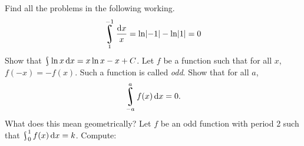 \begin{questions}
  \questioA Find all the problems in the following working.
            \begin{align*}
              \rint^{-1}_1 \frac{\dif{x}}{x} = \ln \abs{-1} - \ln \abs{1} = 0
            \end{align*}
  \questioA Show that $ \rint \ln x \dif{x} = x\ln x - x + C $.
  \questioM Let $ f $ be a function such that for all $ x $, $ f(-x) = -f(x) $. Such a function is called \textit{odd}. Show that for all $ a $,
            \begin{displaymath}
              \rint^a_{-a} f(x) \dif{x} = 0.
            \end{displaymath}
            What does this mean geometrically?
  \questioM Let $ f $ be an odd function with period 2 such that $ \rint^{1}_0 f(x) \dif{x} = k $. Compute:
\end{questions}
